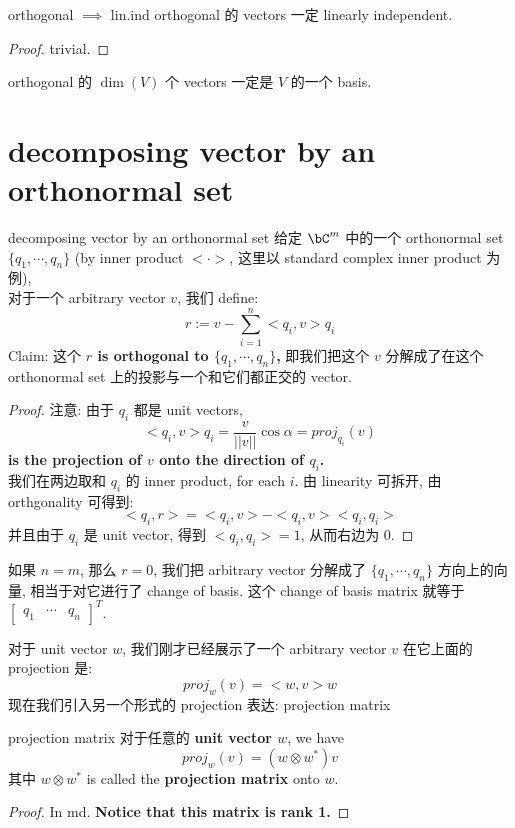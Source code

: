\documentclass[lang=cn,11pt]{elegantbook}
\begin{document}
\begin{theorem}{orthogonal $\implies$ lin.ind}
    orthogonal 的 vectors 一定 linearly independent.
\end{theorem}
\begin{proof}
    trivial.
\end{proof}
\begin{corollary}
    orthogonal 的 $\dim(V)$ 个 vectors 一定是 $V$ 的一个 basis.
\end{corollary}


\section{decomposing vector by an orthonormal set}
\begin{theorem}{decomposing vector by an orthonormal set}
给定 $\bC^m$ 中的一个 orthonormal set $\{q_1, \cdots, q_n\}$ (by inner product $<\cdot>$, 这里以 standard complex inner product 为例), 
\\对于一个 arbitrary vector $v$, 我们 define:
$$
r:= v - \sum_{i=1}^n <q_i, v>   q_i
$$
Claim: 这个 \textbf{$r$ is orthogonal to $\{q_1, \cdots, q_n\}$,} 即我们把这个 $v$ 分解成了在这个 orthonormal set 上的投影与一个和它们都正交的 vector.
\end{theorem}
\begin{proof}
    注意: 由于 $q_i$ 都是 unit vectors, $$<q_i, v> q_i = \frac{v}{||v||} \cos \alpha = proj_{q_i}(v)$$\textbf{ is the projection of $v$ onto the direction of $q_i$.}\\
我们在两边取和 $q_i$ 的 inner product, for each $i$. 由 linearity 可拆开, 由 orthgonality 可得到:
$$
<q_i,r> = <q_i,v> - <q_i,v><q_i,q_i>
$$
并且由于 $q_i$ 是 unit vector, 得到 $<q_i,q_i>=1$, 从而右边为 0.
\end{proof}
\begin{remark}
    如果 $n=m$, 那么 $r=0$, 我们把 arbitrary vector 分解成了 $\{q_1, \cdots, q_n\}$ 方向上的向量, 相当于对它进行了 change of basis. 这个 change of basis matrix 就等于 $\begin{bmatrix} q_1  & \cdots  & q_n \end{bmatrix}^T$.
\end{remark}


 对于 unit vector $w$, 我们刚才已经展示了一个 arbitrary vector $v$ 在它上面的 projection 是:$$proj_w (v) = <w, v> w  $$
 现在我们引入另一个形式的 projection 表达: projection matrix

\begin{theorem}{projection matrix}
对于任意的 \textbf{unit vector $w$}, we have
$$proj_w (v) = (w \otimes w^*) v $$
其中 $w\otimes w^*$ is called the \textbf{projection matrix} onto $w$.
\end{theorem}
\begin{proof}
    In md.
\textbf{    Notice that this matrix is rank 1.}
\end{proof}
\end{document}
